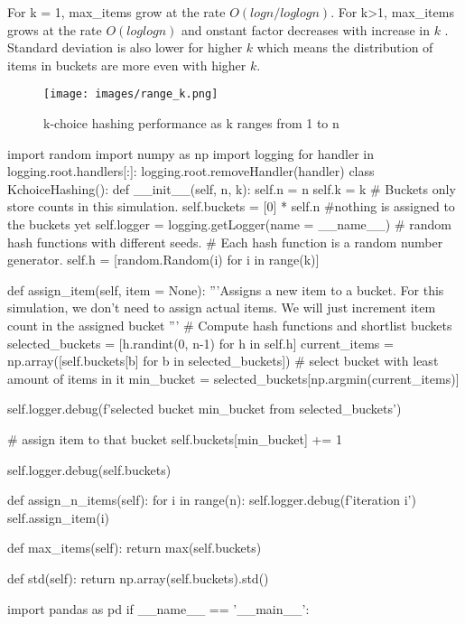 \documentclass{homeworg}
\begin{document}
For k = 1, max\_items grow at the rate $O(logn/loglogn)$. For k>1, max\_items grows at the rate $O(loglogn)$ and    onstant factor decreases with increase in $k$ . Standard deviation is also lower for higher $k$ which means the distribution of items in buckets are more even with higher $k$.

\begin{figure}
    \centering
    \texttt{[image: images/range\_k.png]}
    \caption{k-choice hashing performance as k ranges from 1 to n}
    \label{fig:my_label}
\end{figure}
\begin{python}
import random
import numpy as np
import logging
for handler in logging.root.handlers[:]:
    logging.root.removeHandler(handler)
class KchoiceHashing():
    def __init__(self, n, k):
        self.n = n
        self.k = k
        # Buckets only store counts in this simulation.
        self.buckets = [0] * self.n #nothing is assigned to the buckets yet
        self.logger = logging.getLogger(name = __name__)
        # random hash functions with different seeds.
        # Each hash function is a random number generator.
        self.h = [random.Random(i) for i in range(k)]

    def assign_item(self, item = None):
        '''Assigns a new item to a bucket.
        For this simulation, we don't need to assign actual items.
        We will just increment item count in the assigned bucket 
        '''
        # Compute hash functions and shortlist buckets
        selected_buckets = [h.randint(0, n-1) for h in self.h]
        current_items = np.array([self.buckets[b] for b in selected_buckets])
        # select bucket with least amount of items in it
        min_bucket = selected_buckets[np.argmin(current_items)]

        self.logger.debug(f'selected bucket {min_bucket} from {selected_buckets}')

        # assign item to that bucket
        self.buckets[min_bucket] += 1

        self.logger.debug(self.buckets)

    def assign_n_items(self):
        for i in range(n):
            self.logger.debug(f'iteration {i}')
            self.assign_item(i)
    
    def max_items(self):
        return max(self.buckets)

    def std(self):
        return np.array(self.buckets).std()

import pandas as pd
if __name__ == '__main__':


\end{python}
\end{document}
